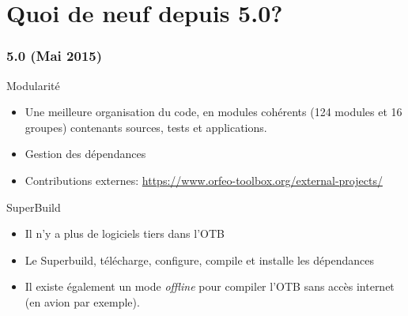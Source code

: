 \documentclass[8pt]{beamer}
\begin{document}
\section{Quoi de neuf depuis 5.0?}

\begin{frame}
\frametitle{5.0 (Mai 2015)}
\begin{block}{Modularité}
\begin{itemize}
\item Une meilleure organisation du code, en modules cohérents (124 modules et
    16 groupes) contenants sources, tests et applications.
\item Gestion des dépendances
\item Contributions externes: \url{https://www.orfeo-toolbox.org/external-projects/}
\end{itemize}
\end{block}

\begin{block}{SuperBuild}
\begin{itemize}
\item Il n'y a plus de logiciels tiers dans l'OTB
\item Le Superbuild, télécharge, configure, compile et installe les dépendances
\item Il existe également un mode \textit{offline} pour compiler l'OTB sans
  accès internet (en avion par exemple).
\end{itemize}
\end{block}
\end{frame}
\end{document}
